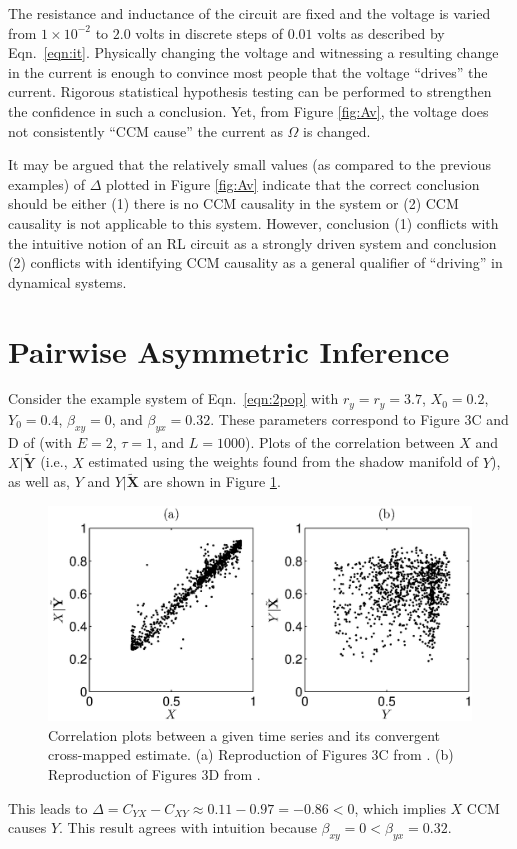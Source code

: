 \documentclass[twocolumn,aps,pre,groupedaddress]{revtex4-1}
\begin{document}
The resistance and inductance of the circuit are fixed and the voltage is varied from $1\times 10^{-2}$ to $2.0$ volts in discrete steps of $0.01$ volts as described by Eqn.\ \ref{eqn:it}.  Physically changing the voltage and witnessing a resulting change in the current is enough to convince most people that the voltage ``drives'' the current.  Rigorous statistical hypothesis testing can be performed to strengthen the confidence in such a conclusion.  Yet, from Figure \ref{fig:Av}, the voltage does not consistently ``CCM cause'' the current as $\Omega$ is changed. 

It may be argued that the relatively small values (as compared to the previous examples) of $\Delta$ plotted in Figure \ref{fig:Av} indicate that the correct conclusion should be either (1) there is no CCM causality in the system or (2) CCM causality is not applicable to this system.  However, conclusion (1) conflicts with the intuitive notion of an RL circuit as a strongly driven system and conclusion (2) conflicts with identifying CCM causality as a general qualifier of ``driving'' in dynamical systems.

\section{Pairwise Asymmetric Inference}
\label{sec:PAI}

Consider the example system of Eqn.\ \ref{eqn:2pop} with $r_y=r_y=3.7$, $X_0 = 0.2$, $Y_0=0.4$, $\beta_{xy}=0$, and $\beta_{yx}=0.32$.  These parameters correspond to Figure 3C and D of \cite{Sugihara2012} (with $E=2$, $\tau=1$, and $L=1000$).  Plots of the correlation between $X$ and $X|\tilde{\mathbf{Y}}$ (i.e., $X$ estimated using the weights found from the shadow manifold of $Y$), as well as, $Y$ and $Y|\tilde{\mathbf{X}}$ are shown in Figure \ref{fig:Sug3CDredo}.
\begin{figure}[ht]
\includegraphics[scale=0.5]{SugFig3CD.eps} 
\caption{Correlation plots between a given time series and its convergent cross-mapped estimate.  (a) Reproduction of Figures 3C from \cite{Sugihara2012}. (b) Reproduction of Figures 3D from \cite{Sugihara2012}.}
\label{fig:Sug3CDredo}
\end{figure}
This leads to $\Delta=C_{YX}-C_{XY}\approx 0.11 - 0.97 = -0.86 <0$, which implies $X$ CCM causes $Y$.  This result agrees with intuition because $\beta_{xy}=0 < \beta_{yx} = 0.32$.
\end{document}
